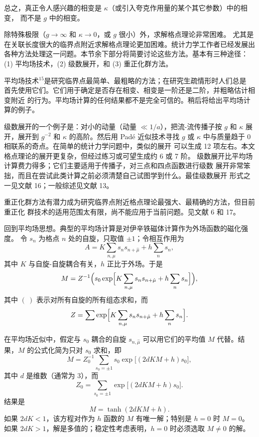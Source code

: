 总之，真正令人感兴趣的相变是 $\kappa$（或引入夸克作用量的某个其它参数）中的相变，
而不是 $g$ 中的相变。

除特殊极限（$g\to\infty$ 和 $\kappa\to0$，或 $g$ 很小）外，求解格点理论非常困难。
尤其是在关联长度很大的临界点附近求解格点理论更加困难。统计力学工作者已经发展出
各种方法处理这一问题。本节余下部分将简要讨论这些方法。基本有三种途径：
(1) 平均场技术，(2) 级数展开，和 (3) 重正化群方法。

平均场技术${}^{15}$是研究临界点最简单、最粗略的方法；在研究生疏情形时人们总是
首先使用它们。它们用于确定是否存在相变、相变是一阶还是二阶，并粗略估计相变附近
的行为。平均场计算的任何结果都不是完全可信的。稍后将给出平均场计算的例子。

级数展开的一个例子是：对小的动量（动量 $\ll 1/a$），把流-流传播子按 $g$ 和
$\kappa$ 展开，展开到 $g^{-2}$ 和 $\kappa$ 的高阶。然后用 Pad\'e 近似技术寻找
$g$ 或 $\kappa$ 中与质量趋于 0 相联系的奇点。在简单的统计力学问题中，类似的展开
可以生成 12 项左右。本文格点理论的展开更复杂，但经过练习或可望生成约 6 或 7 阶。
级数展开比平均场计算费力得多；它们主要适用于传播子，对三点和四点函数进行级数
展开非常笨拙，而且在尝试此类计算之前必须清楚自己试图学到什么。最佳级数展开
形式之一见文献 16；一般综述见文献 13。

重正化群方法有潜力成为研究临界点附近格点理论最强大、最精确的方法，但目前重正化
群技术的适用范围太有限，尚不能应用于当前问题。见文献 6 和 17。

回到平均场思想。典型的平均场计算是对伊辛铁磁体计算作为外场函数的磁化强度。
令 $s_{n}$ 为格点 $n$ 处的自旋，只取值 $\pm 1$；令相互作用为
\begin{equation}
A = K\sum_{n,\mu}s_{n}s_{n+\hat\mu} + h\sum_{n}s_{n},
\label{eq:6.1}
\end{equation}
其中 $K$ 与自旋-自旋耦合有关，$h$ 正比于外场。于是
\begin{equation}
M = Z^{-1}\Bigl(s_{0}\exp\Bigl[K\sum_{n,\mu}s_{n}s_{n+\hat\mu}
    + h\sum_{n}s_{n}\Bigr]\Bigr),
\label{eq:6.2}
\end{equation}
其中 $(\ )$ 表示对所有自旋的所有组态求和，而
\begin{equation}
Z = \sum\exp\Bigl[K\sum_{n,\mu}s_{n}s_{n+\hat\mu}
    + h\sum_{n}s_{n}\Bigr].
\label{eq:6.3}
\end{equation}

在平均场近似中，假定与 $s_{0}$ 耦合的自旋 $s_{n,\hat\mu}$ 可以用它们的平均值 $M$
代替。结果，$M$ 的公式化简为只对 $s_{0}$ 求和，即
\begin{equation}
M = Z_{0}^{-1}\sum_{s_{0}=\pm 1}s_{0}\exp\bigl[(2dKM+h)s_{0}\bigr],
\label{eq:6.4}
\end{equation}
其中 $d$ 是维数（通常为 3），而
\begin{equation}
Z_{0} = \sum_{s_{0}=\pm 1}\exp\bigl[(2dKM+h)s_{0}\bigr].
\label{eq:6.5}
\end{equation}
结果是
\begin{equation}
M = \tanh(2dKM+h).
\label{eq:6.6}
\end{equation}
如果 $2dK<1$，该方程对作为 $h$ 函数的 $M$ 有唯一解；特别是 $h=0$ 时 $M=0$。
如果 $2dK>1$，解是多值的；稳定性考虑表明，$h=0$ 时必须选取 $M\ne0$ 的解。

